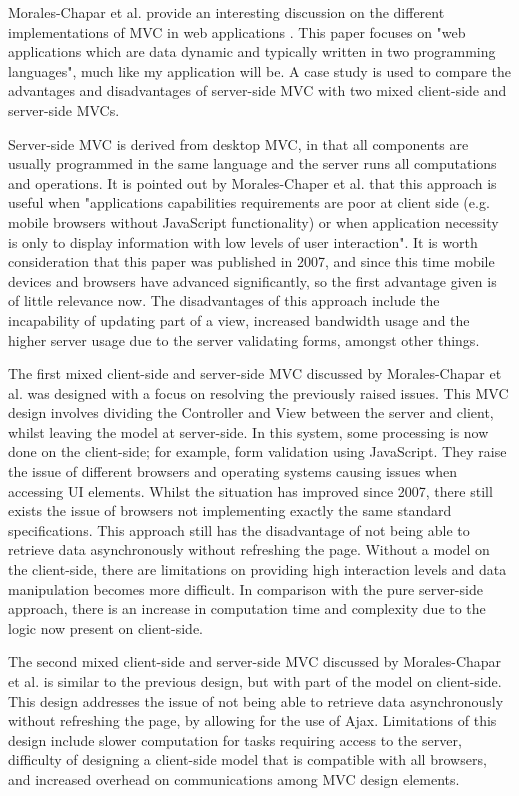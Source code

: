 \documentclass[authoryearcitations]{UoYCSproject}
\begin{document}
Morales-Chapar et al. provide an interesting discussion on the different implementations of MVC in web applications \citep{Morales-Chaparro2007}. This paper focuses on "web applications which are data dynamic and typically written in two programming languages", much like my application will be. A case study is used to compare the advantages and disadvantages of server-side MVC with two mixed client-side and server-side MVCs. 

Server-side MVC is derived from desktop MVC, in that all components are usually programmed in the same language and the server runs all computations and operations. It is pointed out by Morales-Chaper et al. that this approach is useful when "applications capabilities requirements are poor at client side (e.g. mobile browsers without JavaScript functionality) or when application necessity is only to display information with low levels of user interaction". It is worth consideration that this paper was published in 2007, and since this time mobile devices and browsers have advanced significantly, so the first advantage given is of little relevance now. The disadvantages of this approach include the incapability of updating part of a view, increased bandwidth usage and the higher server usage due to the server validating forms, amongst other things.  

The first mixed client-side and server-side MVC discussed by Morales-Chapar et al. was designed with a focus on resolving the previously raised issues. This MVC design involves dividing the Controller and View between the server and client, whilst leaving the model at server-side. In this system, some processing is now done on the client-side; for example, form validation using JavaScript. They raise the issue of different browsers and operating systems causing issues when accessing UI elements. Whilst the situation has improved since 2007, there still exists the issue of browsers not implementing exactly the same standard specifications. This approach still has the disadvantage of not being able to retrieve data asynchronously without refreshing the page. Without a model on the client-side, there are limitations on providing high interaction levels and data manipulation becomes more difficult. In comparison with the pure server-side approach, there is an increase in computation time and complexity due to the logic now present on client-side. 

The second mixed client-side and server-side MVC discussed by Morales-Chapar et al. is similar to the previous design, but with part of the model on client-side. This design addresses the issue of not being able to retrieve data asynchronously without refreshing the page, by allowing for the use of Ajax. Limitations of this design include slower computation for tasks requiring access to the server, difficulty of designing a client-side model that is compatible with all browsers, and increased overhead on communications among MVC design elements. 
\end{document}
